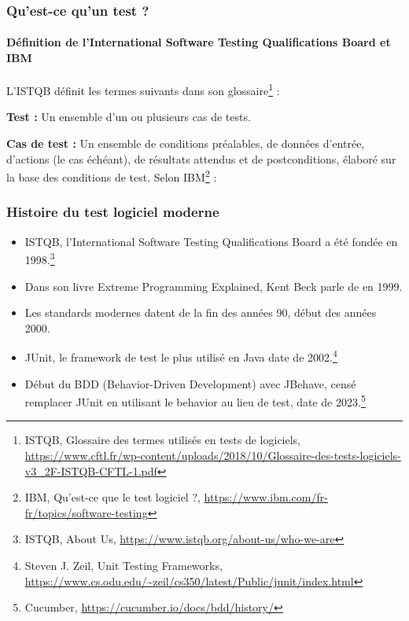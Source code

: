 \documentclass{beamer}
\begin{document}
    \begin{frame}
        \frametitle{Qu’est-ce qu’un test ?}
        \framesubtitle{Définition de l'International Software Testing Qualifications Board et IBM}
        \transdissolve
        L’ISTQB définit les termes suivants dans son glossaire\footnote{ISTQB, Glossaire des termes utilisés en tests de logiciels, \url{https://www.cftl.fr/wp-content/uploads/2018/10/Glossaire-des-tests-logiciels-v3_2F-ISTQB-CFTL-1.pdf}} :

        \textbf{Test :} Un ensemble d’un ou plusieurs cas
        de tests.

        \textbf{Cas de test :} Un ensemble de conditions
        préalables, de données d'entrée, d'actions
        (le cas échéant), de résultats attendus et
        de postconditions, élaboré sur la base des
        conditions de test.
        \bigbreak
        Selon IBM\footnote{IBM, Qu'est-ce que le test logiciel ?, \url{https://www.ibm.com/fr-fr/topics/software-testing}} :

    \end{frame}

    \begin{frame}
        \frametitle{Histoire du test logiciel moderne}
        \transdissolve
        \begin{itemize}
            \item ISTQB, l’International Software Testing Qualifications Board a été fondée en 1998.\footnote{ISTQB, About Us, \url{https://www.istqb.org/about-us/who-we-are}}

            \item Dans son livre Extreme Programming Explained, Kent Beck parle de  en 1999.

            \item Les standards modernes datent de la fin des années 90, début des années 2000.

            \item JUnit, le framework de test le plus utilisé en Java date de 2002.\footnote{Steven J. Zeil, Unit Testing Frameworks, \url{https://www.cs.odu.edu/~zeil/cs350/latest/Public/junit/index.html}}

            \item Début du BDD (Behavior-Driven Development) avec JBehave, censé remplacer JUnit en utilisant le behavior au lieu de test, date de 2023.\footnote{Cucumber, \url{https://cucumber.io/docs/bdd/history/}}
        \end{itemize}
    \end{frame}
\end{document}

